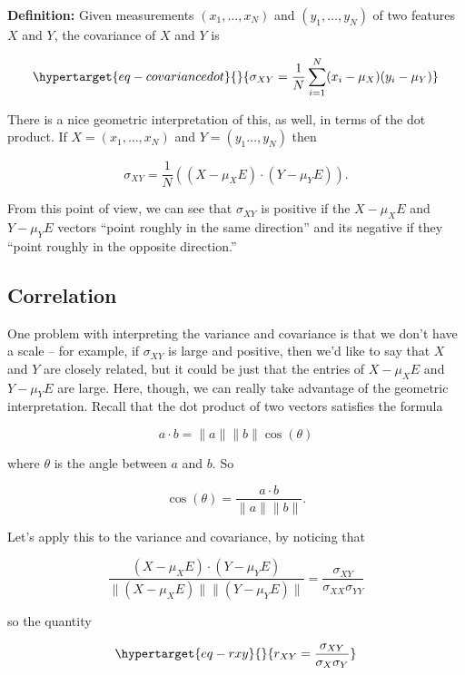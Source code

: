 \documentclass[
  11pt,
  letterpaper,
]{scrbook}
\theoremstyle{plain}
\theoremstyle{plain}
\theoremstyle{remark}
\begin{document}
\textbf{Definition:} Given measurements \((x_1,\ldots, x_N)\) and
\((y_1,\ldots, y_N)\) of two features \(X\) and \(Y\), the covariance of
\(X\) and \(Y\) is

\begin{equation}\protect\hypertarget{eq-covariancedot}{}{
\sigma_{XY} = \frac{1}{N}\sum_{i=1}^{N} (x_i-\mu_{X})(y_i-\mu_{Y})
}\label{eq-covariancedot}\end{equation}

There is a nice geometric interpretation of this, as well, in terms of
the dot product. If \(X=(x_1,\ldots, x_N)\) and \(Y=(y_1\ldots,y_N)\)
then

\[
\sigma_{XY} = \frac{1}{N} ((X-\mu_{X}E)\cdot (Y-\mu_{Y}E)).
\]

From this point of view, we can see that \(\sigma_{XY}\) is positive if
the \(X-\mu_{X}E\) and \(Y-\mu_{Y}E\) vectors ``point roughly in the
same direction'' and its negative if they ``point roughly in the
opposite direction.''

\hypertarget{correlation}{%
\subsection{Correlation}\label{correlation}}

One problem with interpreting the variance and covariance is that we
don't have a scale -- for example, if \(\sigma_{XY}\) is large and
positive, then we'd like to say that \(X\) and \(Y\) are closely
related, but it could be just that the entries of \(X-\mu_{X}E\) and
\(Y-\mu_{Y}E\) are large. Here, though, we can really take advantage of
the geometric interpretation. Recall that the dot product of two vectors
satisfies the formula

\[
a \cdot b = \|a\|\|b\|\cos(\theta)
\]

where \(\theta\) is the angle between \(a\) and \(b\). So

\[
\cos(\theta) = \frac{a\cdot b}{\|a\|\|b\|}.
\]

Let's apply this to the variance and covariance, by noticing that

\[
\frac{(X-\mu_{X}E)\cdot (Y-\mu_{Y}E)}{\|(X-\mu_{X}E)\|\|(Y-\mu_{Y}E)\|} = \frac{\sigma_{XY}}{\sigma_{XX}\sigma_{YY}}
\]

so the quantity

\begin{equation}\protect\hypertarget{eq-rxy}{}{
r_{XY} = \frac{\sigma_{XY}}{\sigma_{X}\sigma_{Y}}
}\label{eq-rxy}\end{equation}
\end{document}
